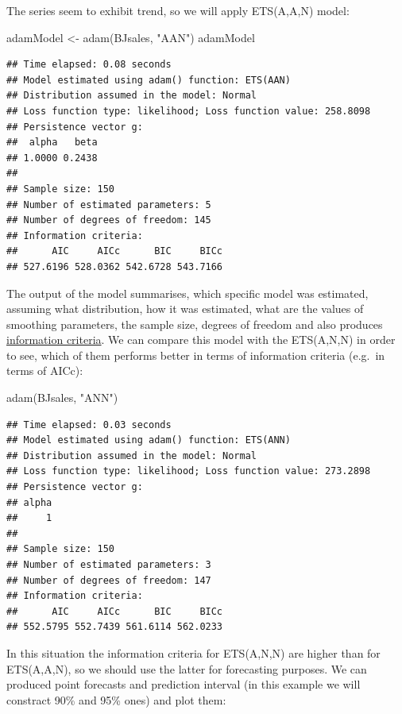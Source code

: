 \documentclass[
]{book}
\newenvironment{Shaded}{\begin{snugshade}}{\end{snugshade}}
\newcommand{\FunctionTok}[1]{\textcolor[rgb]{0.00,0.00,0.00}{#1}}
\newcommand{\NormalTok}[1]{#1}
\newcommand{\OtherTok}[1]{\textcolor[rgb]{0.56,0.35,0.01}{#1}}
\newcommand{\StringTok}[1]{\textcolor[rgb]{0.31,0.60,0.02}{#1}}
\theoremstyle{definition}
\theoremstyle{definition}
\theoremstyle{definition}
\theoremstyle{definition}
\theoremstyle{remark}
\begin{document}
The series seem to exhibit trend, so we will apply ETS(A,A,N) model:

\begin{Shaded}
\begin{Highlighting}[]
\NormalTok{adamModel }\OtherTok{\textless{}{-}} \FunctionTok{adam}\NormalTok{(BJsales, }\StringTok{"AAN"}\NormalTok{)}
\NormalTok{adamModel}
\end{Highlighting}
\end{Shaded}

\begin{verbatim}
## Time elapsed: 0.08 seconds
## Model estimated using adam() function: ETS(AAN)
## Distribution assumed in the model: Normal
## Loss function type: likelihood; Loss function value: 258.8098
## Persistence vector g:
##  alpha   beta 
## 1.0000 0.2438 
## 
## Sample size: 150
## Number of estimated parameters: 5
## Number of degrees of freedom: 145
## Information criteria:
##      AIC     AICc      BIC     BICc 
## 527.6196 528.0362 542.6728 543.7166
\end{verbatim}

The output of the model summarises, which specific model was estimated, assuming what distribution, how it was estimated, what are the values of smoothing parameters, the sample size, degrees of freedom and also produces \protect\hyperlink{modelSelection}{information criteria}. We can compare this model with the ETS(A,N,N) in order to see, which of them performs better in terms of information criteria (e.g.~in terms of AICc):

\begin{Shaded}
\begin{Highlighting}[]
\FunctionTok{adam}\NormalTok{(BJsales, }\StringTok{"ANN"}\NormalTok{)}
\end{Highlighting}
\end{Shaded}

\begin{verbatim}
## Time elapsed: 0.03 seconds
## Model estimated using adam() function: ETS(ANN)
## Distribution assumed in the model: Normal
## Loss function type: likelihood; Loss function value: 273.2898
## Persistence vector g:
## alpha 
##     1 
## 
## Sample size: 150
## Number of estimated parameters: 3
## Number of degrees of freedom: 147
## Information criteria:
##      AIC     AICc      BIC     BICc 
## 552.5795 552.7439 561.6114 562.0233
\end{verbatim}

In this situation the information criteria for ETS(A,N,N) are higher than for ETS(A,A,N), so we should use the latter for forecasting purposes. We can produced point forecasts and prediction interval (in this example we will constract 90\% and 95\% ones) and plot them:
\end{document}
